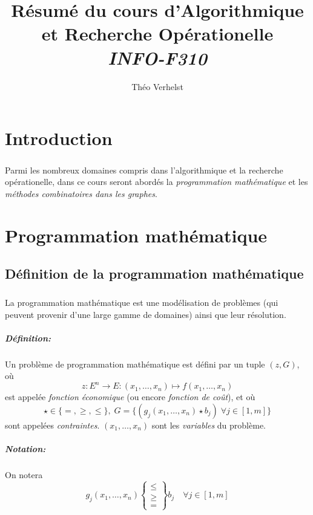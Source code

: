 \documentclass[a4paper]{report}
\author{Théo Verhelst}
\title{Résumé du cours d'Algorithmique et Recherche Opérationelle\\
\emph{INFO-F310}}
\begin{document}
\maketitle
\tableofcontents

\chapter{Introduction}
\paragraph{}
Parmi les nombreux domaines compris dans l'algorithmique et la recherche
opérationelle, dans ce cours seront abordés la \emph{programmation mathématique}
et les \emph{méthodes combinatoires dans les graphes}.

\chapter{Programmation mathématique}
\section{Définition de la programmation mathématique}
\paragraph{}
La programmation mathématique est une modélisation de problèmes (qui peuvent
provenir d'une large gamme de domaines) ainsi que leur résolution.

\paragraph{Définition:} Un problème de programmation mathématique est défini
par un tuple \((z, G)\), où
\[z:E^n\to E:(x_1,\dots,x_n)\mapsto f(x_1,\dots,x_n)\]
est appelée \emph{fonction économique} (ou encore \emph{fonction de coût}), et
où \[\star\in\{=,\ge,\le\},\;G=\{(g_j(x_1,\dots,x_n)\star b_j)\;\forall
j\in[1,m]\}\] sont appelées \emph{contraintes}.
\((x_1,\dots,x_n)\) sont les \emph{variables} du problème.

\paragraph{Notation:}On notera
\[g_j(x_1,\dots,x_n)\begin{Bmatrix}\le\\\ge\\=\end{Bmatrix}b_j\quad\forall
j\in[1,m]\]
\end{document}
